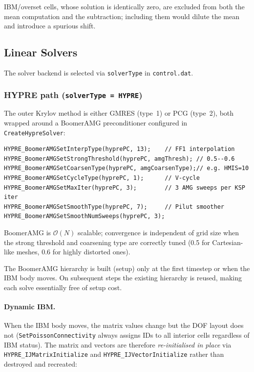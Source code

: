 \documentclass[12pt,a4paper]{article}
\begin{document}
IBM/overset cells, whose solution is identically zero, are excluded from
both the mean computation and the subtraction; including them would
dilute the mean and introduce a spurious shift.

\subsection{Linear Solvers}
\label{sec:peqn-solvers}

The solver backend is selected via \texttt{solverType} in
\texttt{control.dat}.

\subsubsection{HYPRE path (\texttt{solverType = HYPRE})}

The outer Krylov method is either GMRES (type~1) or PCG (type~2), both
wrapped around a BoomerAMG preconditioner configured in
\texttt{CreateHypreSolver}:

\begin{lstlisting}[caption={BoomerAMG configuration in \texttt{CreateHypreSolver}.}]
HYPRE_BoomerAMGSetInterpType(hyprePC, 13);    // FF1 interpolation
HYPRE_BoomerAMGSetStrongThreshold(hyprePC, amgThresh); // 0.5--0.6
HYPRE_BoomerAMGSetCoarsenType(hyprePC, amgCoarsenType);// e.g. HMIS=10
HYPRE_BoomerAMGSetCycleType(hyprePC, 1);      // V-cycle
HYPRE_BoomerAMGSetMaxIter(hyprePC, 3);        // 3 AMG sweeps per KSP iter
HYPRE_BoomerAMGSetSmoothType(hyprePC, 7);     // Pilut smoother
HYPRE_BoomerAMGSetSmoothNumSweeps(hyprePC, 3);
\end{lstlisting}

BoomerAMG is $\mathcal{O}(N)$ scalable; convergence is independent of
grid size when the strong threshold and coarsening type are correctly
tuned (0.5 for Cartesian-like meshes, 0.6 for highly distorted ones).

The BoomerAMG hierarchy is built (setup) only at the first timestep or
when the IBM body moves.  On subsequent steps the existing hierarchy is
reused, making each solve essentially free of setup cost.

\paragraph{Dynamic IBM.}
When the IBM body moves, the matrix values change but the DOF layout
does not (\texttt{SetPoissonConnectivity} always assigns IDs to all
interior cells regardless of IBM status).  The matrix and vectors are
therefore \emph{re-initialised in place} via
\texttt{HYPRE\_IJMatrixInitialize} and \texttt{HYPRE\_IJVectorInitialize}
rather than destroyed and recreated:
\end{document}
